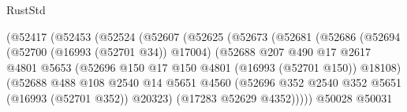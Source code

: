\begin{lexlean}{RustStd}
\begin{coremodule}
{\begin{coremodule}
{{{{{{{{{{{{{{{{{{{{{{{{{{{{{{{{{{{{{{{{{{{{{{{{{{{{{{{                                      (@52417
                                        (@52453
                                          (@52524
                                            (@52607
                                              (@52625
                                                (@52673
                                                  (@52681
                                                    (@52686
                                                      (@52694
                                                        (@52700 (@16993 (@52701 @34)) @17004)
                                                        (@52688
                                                          @207
                                                          @490
                                                          @17
                                                          @2617
                                                          @4801
                                                          @5653
                                                          (@52696
                                                            @150
                                                            @17
                                                            @150
                                                            @4801
                                                            (@16993 (@52701 @150))
                                                            @18108)
                                                          (@52688
                                                            @488
                                                            @108
                                                            @2540
                                                            @14
                                                            @5651
                                                            @4560
                                                            (@52696
                                                              @352
                                                              @2540
                                                              @352
                                                              @5651
                                                              (@16993 (@52701 @352))
                                                              @20323)
                                                            (@17283 @52629 @4352)))))
                                                    @50028
                                                    @50031
}}}}}}}}}}}}}}}}}}}}}}}}}}}}}}}}}}}}}}}}}}}}}}}}}}}}}}}
\end{coremodule}}
\end{coremodule}
\end{lexlean}
